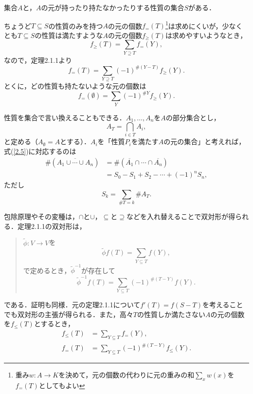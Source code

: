 \documentclass[xelatex,ja=standard,a4paper,14pt,everyparhook=compat]{bxjsarticle}
\newcommand{\inv}[1]{#1^{-1}}
\theoremstyle{definition}
\begin{document}
集合$A$と，$A$の元が持ったり持たなかったりする性質の集合$S$がある．

ちょうど$T \subseteq S$の性質のみを持つ$A$の元の個数$f_=(T)$\footnote{重み$w:A \to K$を決めて，元の個数の代わりに元の重みの和$\sum_x w(x)$を$f_=(T)$としてもよい}は求めにくいが，少なくとも$T \subseteq S$の性質は満たすような$A$の元の個数$f_\geq(T)$は求めやすいようなとき， \begin{equation*}
    f_\geq(T) = \sum_{Y \supseteq T} f_=(Y),
\end{equation*}
なので，定理2.1.1より \begin{equation*}
    f_=(T) = \sum_{Y \supseteq T} (-1)^{\#(Y-T)} f_\geq(Y).
\end{equation*}
とくに，どの性質も持たないような元の個数は \begin{equation} \label{2.5}
    f_=(\emptyset) = \sum_{Y} (-1)^{\#Y} f_\geq(Y).
\end{equation}

性質を集合で言い換えることもできる．$A_1,\ldots,A_n$を$A$の部分集合とし， \begin{equation*}
    A_T = \bigcap_{i \in T} A_i,
\end{equation*}
と定める（$A_\emptyset = A$とする）．$A_i$を「性質$P_i$を満たす$A$の元の集合」と考えれば，式(\ref{2.5})に対応するのは \begin{align*}
    \#(\overline{A_1 \cup \cdots \cup A_n})
     & = \#(\overline{A_1} \cap \cdots \cap \overline{A_n}) \\
     & = S_0 - S_1 + S_2 - \cdots + (-1)^n S_n,
\end{align*}
ただし \begin{equation*}
    S_k = \sum_{\#T = k} \#A_T.
\end{equation*}

包除原理やその変種は，$\cap$と$\cup$，$\subseteq$と$\supseteq$などを入れ替えることで双対形が得られる．定理2.1.1の双対形は， \begin{quote}
    $\widetilde\phi : V \to V$を \begin{equation*}
        \widetilde\phi f(T) = \sum_{Y \subseteq T} f(Y),
    \end{equation*}
    で定めるとき，$\inv{\widetilde\phi}$が存在して \begin{equation*}
        \inv{\widetilde\phi} f(T) = \sum_{Y \subseteq T} (-1)^{\#(T-Y)} f(Y).
    \end{equation*}
\end{quote}
である．証明も同様．元の定理2.1.1について$f'(T) = f(S-T)$を考えることでも双対形の主張が得られる．また，高々$T$の性質しか満たさない$A$の元の個数を$f_\leq(T)$とするとき， \begin{align*}
    f_\leq(T) & = \sum_{Y \subseteq T} f_=(Y),                   \\
    f_=(T)    & = \sum_{Y \subseteq T} (-1)^{\#(T-Y)} f_\leq(Y).
\end{align*}
\end{document}
